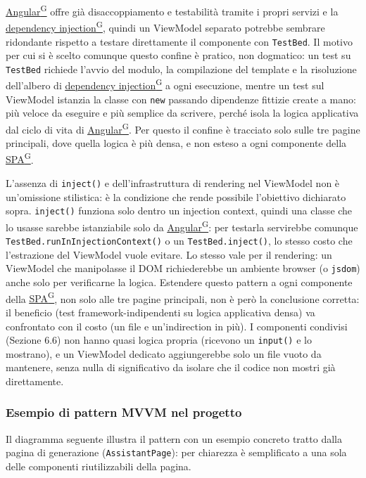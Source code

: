 \documentclass[a4paper,12pt]{article}
\providecommand{\glslink}[2]{\href{https://alittlebyte-19.github.io/Documentazione/glossario.html\#gls-#1}{\underline{#2}\textsuperscript{\scriptsize G}}}
\begin{document}
\begin{sloppypar}
\glslink{angular}{Angular} offre già disaccoppiamento e testabilità tramite i propri servizi e la \glslink{dependency-injection}{dependency injection}, quindi un ViewModel separato potrebbe sembrare ridondante rispetto a testare direttamente il componente con \texttt{TestBed}. Il motivo per cui si è scelto comunque questo confine è pratico, non dogmatico: un test su \texttt{TestBed} richiede l'avvio del modulo, la compilazione del template e la risoluzione dell'albero di \glslink{dependency-injection}{dependency injection} a ogni esecuzione, mentre un test sul ViewModel istanzia la classe con \texttt{new} passando dipendenze fittizie create a mano: più veloce da eseguire e più semplice da scrivere, perché isola la logica applicativa dal ciclo di vita di \glslink{angular}{Angular}. Per questo il confine è tracciato solo sulle tre pagine principali, dove quella logica è più densa, e non esteso a ogni componente della \glslink{spa-single-page-application}{SPA}.

L'assenza di \texttt{inject()} e dell'infrastruttura di rendering nel ViewModel non è un'omissione stilistica: è la condizione che rende possibile l'obiettivo dichiarato sopra. \texttt{inject()} funziona solo dentro un injection context, quindi una classe che lo usasse sarebbe istanziabile solo da \glslink{angular}{Angular}: per testarla servirebbe comunque \texttt{TestBed.runInInjectionContext()} o un \texttt{TestBed.inject()}, lo stesso costo che l'estrazione del ViewModel vuole evitare. Lo stesso vale per il rendering: un ViewModel che manipolasse il DOM richiederebbe un ambiente browser (o \texttt{jsdom}) anche solo per verificarne la logica. Estendere questo pattern a ogni componente della \glslink{spa-single-page-application}{SPA}, non solo alle tre pagine principali, non è però la conclusione corretta: il beneficio (test framework-indipendenti su logica applicativa densa) va confrontato con il costo (un file e un'indirection in più). I componenti condivisi (Sezione 6.6) non hanno quasi logica propria (ricevono un \texttt{input()} e lo mostrano), e un ViewModel dedicato aggiungerebbe solo un file vuoto da mantenere, senza nulla di significativo da isolare che il codice non mostri già direttamente.

\subsubsection{Esempio di pattern MVVM nel progetto}

Il diagramma seguente illustra il pattern con un esempio concreto tratto dalla pagina di generazione (\texttt{AssistantPage}): per chiarezza è semplificato a una sola delle componenti riutilizzabili della pagina.


\end{sloppypar}
\end{document}
